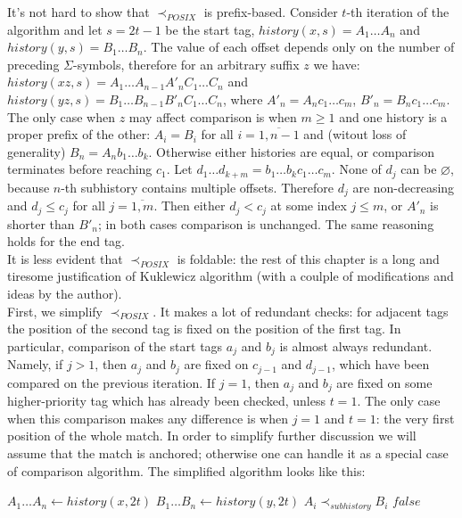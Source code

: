 \documentclass{article}
\newcommand{\Xset}{\!\leftarrow\!}
\newcommand{\Xeq}{\!=\!}
\theoremstyle{definition}
\begin{document}
\begin{multicols}{2}
It's not hard to show that $\prec_{POSIX}$ is prefix-based.
Consider $t$-th iteration of the algorithm and let $s \Xeq 2t \!-\! 1$ be the start tag,
$history(x, s) \Xeq A_1 \dots A_n$ and $history(y, s) \Xeq B_1 \dots B_n$.
The value of each offset depends only on the number of preceding $\Sigma$-symbols,
therefore for an arbitrary suffix $z$ we have:
$history(xz, s) \Xeq A_1 \dots A_{n-1} A'_n C_1 \dots C_n$ and
$history(yz, s) \Xeq B_1 \dots B_{n-1} B'_n C_1 \dots C_n$,
where $A'_n \Xeq A_n c_1 \dots c_m$, $B'_n \Xeq B_n c_1 \dots c_m$.
The only case when $z$ may affect comparison is when $m \!\geq\! 1$ and one history is a proper prefix of the other:
$A_i \Xeq B_i$ for all $i \Xeq \overline{1,n-1}$ and (witout loss of generality) $B_n \Xeq A_n b_1 \dots b_k$.
Otherwise either histories are equal, or comparison terminates before reaching $c_1$.
Let $d_1 \dots d_{k+m} \Xeq b_1 \dots b_k c_1 \dots c_m$.
None of $d_j$ can be $\varnothing$, because $n$-th subhistory contains multiple offsets.
Therefore $d_j$ are non-decreasing and $d_j \!\leq\! c_j$ for all $j \Xeq \overline{1, m}$.
Then either $d_j \!<\! c_j$ at some index $j \!\leq\! m$, or $A'_n$ is shorter than $B'_n$; in both cases comparison is unchanged.
The same reasoning holds for the end tag.
\\

It is less evident that $\prec_{POSIX}$ is foldable:
the rest of this chapter is a long and tiresome justification of Kuklewicz algorithm
(with a coulple of modifications and ideas by the author).
\\

First, we simplify $\prec_{POSIX}$.
It makes a lot of redundant checks:
for adjacent tags the position of the second tag is fixed on the position of the first tag.
In particular, comparison of the start tags $a_j$ and $b_j$ is almost always redundant.
Namely, if $j \!>\! 1$, then $a_j$ and $b_j$ are fixed on $c_{j-1}$ and $d_{j-1}$, which have been compared on the previous iteration.
If $j \Xeq 1$, then $a_j$ and $b_j$ are fixed on some higher-priority tag which has already been checked, unless $t \Xeq 1$.
The only case when this comparison makes any difference is when $j \Xeq 1$ and $t \Xeq 1$:
the very first position of the whole match.
In order to simplify further discussion we will assume that the match is anchored;
otherwise one can handle it as a special case of comparison algorithm.
The simplified algorithm looks like this:
\\

    \begin{algorithm}[H] \DontPrintSemicolon {} 
     {
        \For {$t \Xeq \overline{1, N}$} {
            $A_1 \dots A_n \Xset history(x, 2t)$ \;
            $B_1 \dots B_n \Xset history(y, 2t)$ \;
            \For {$i \Xeq \overline{1, n}$} {
                 {\Return $A_i \prec_{subhistory} B_i$}
            }
        }
        \Return $false$ \;
    }
    \end{algorithm}



\end{multicols}
\end{document}
